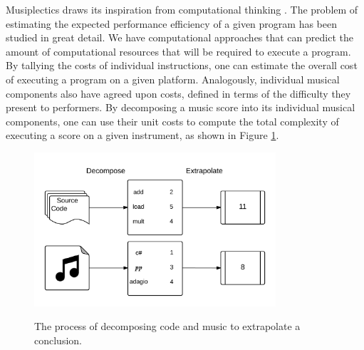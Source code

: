 \documentclass[12pt]{report}
\begin{document}
Musiplectics draws its inspiration from computational thinking \cite{wing2006computational}. The problem of estimating the expected performance efficiency of a given program has been studied in great detail. We have computational approaches that can predict the amount of computational resources that will be required to execute a program. By tallying the costs of individual instructions, one can estimate the overall cost of executing a program on a given platform. Analogously, individual musical components also have agreed upon costs, defined in terms of the difficulty they present to performers. By decomposing a music score into its individual musical components, one can use their unit costs to compute the total complexity of executing a score on a given instrument, as shown in Figure \ref{image:analogy}.



\begin{figure}[ht!]
	\centering
		\caption{The process of decomposing code and music to extrapolate a conclusion.}	\includegraphics[width=0.8\textwidth,natwidth=1650,natheight=1050]{ComputationalThinkingAnalogy.png}
		\label{image:analogy}
\end{figure} 
\end{document}
